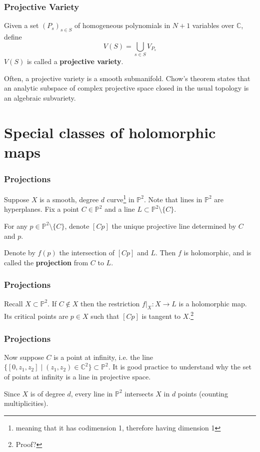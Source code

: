 \documentclass{beamer}
\begin{document}
\begin{frame}
\frametitle{Projective Variety}

Given a set $(P_s)_{s\in S}$ of homogeneous polynomials in $N+1$ variables over $\mathbb{C}$, define \[V(S) = \bigcup_{s\in S}V_{P_s}\] $V(S)$ is called a \textbf{projective variety}.

Often, a projective variety is a smooth submanifold. Chow's theorem states that an analytic subspace of complex projective space closed in the usual topology is an algebraic subvariety.

\end{frame}

\section{Special classes of holomorphic maps}

\begin{frame}
\frametitle{Projections}

Suppose $X$ is a smooth, degree $d$ curve\footnote{meaning that it has codimension 1, therefore having dimension 1} in $\mathbb{P}^2$. Note that lines in $\mathbb{P}^2$ are hyperplanes. Fix a point $C \in \mathbb{P}^2$ and a line $L \subset \mathbb{P}^2\setminus \{C\}$.

\phantom{?}

For any $p \in \mathbb{P}^2\setminus \{C\}$, denote $[Cp]$ the unique projective line determined by $C$ and $p$.

\phantom{?}

Denote by $f(p)$ the intersection of $[Cp]$ and $L$. Then $f$ is holomorphic, and is called the \textbf{projection} from $C$ to $L$.

\end{frame}

\begin{frame}
\frametitle{Projections}
Recall $X \subset \mathbb{P}^2$. If $C \notin X$ then the restriction $f|_X : X \to L$ is a holomorphic map. Its critical points are $p\in X$ such that $[Cp]$ is tangent to $X$.\footnote{Proof?}

\end{frame}

\begin{frame}
\frametitle{Projections}
Now suppose $C$ is a point at infinity, i.e. the line $\{[0,z_1,z_2]\mid (z_1,z_2)\in \mathbb{C}^2\} \subset \mathbb{P}^2$. It is good practice to understand why the set of points at infinity is a line in projective space.

Since $X$ is of degree $d$, every line in $\mathbb{P}^2$ intersects $X$ in $d$ points (counting multiplicities).

\end{frame}
\end{document}
